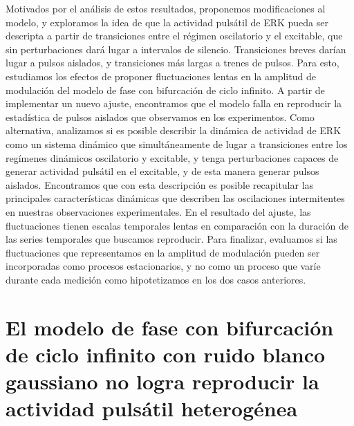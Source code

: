 \documentclass[./main.tex]{subfiles}
\begin{document}
Motivados por el análisis de estos resultados, proponemos modificaciones al modelo, y exploramos la idea de que la actividad pulsátil de ERK pueda ser descripta a partir de transiciones entre el régimen oscilatorio y el excitable, que sin perturbaciones dará lugar a intervalos de silencio. Transiciones breves darían lugar a pulsos aislados, y transiciones más largas a trenes de pulsos. Para esto, estudiamos los efectos de proponer fluctuaciones lentas en la amplitud de modulación del modelo de fase con bifurcación de ciclo infinito. A partir de implementar un nuevo ajuste, encontramos que el modelo falla en reproducir la estadística de pulsos aislados que observamos en los experimentos. Como alternativa, analizamos si es posible describir la dinámica de actividad de ERK como un sistema dinámico que simultáneamente de lugar a transiciones entre los regímenes dinámicos oscilatorio y excitable, y tenga perturbaciones capaces de generar actividad pulsátil en el excitable, y de esta manera generar pulsos aislados. Encontramos que con esta descripción es posible recapitular las principales características dinámicas que describen las oscilaciones intermitentes en nuestras observaciones experimentales. En el resultado del ajuste, las fluctuaciones tienen escalas temporales lentas en comparación con la duración de las series temporales que buscamos reproducir. Para finalizar, evaluamos si las fluctuaciones que representamos en la amplitud de modulación pueden ser incorporadas como procesos estacionarios, y no como un proceso que varíe durante cada medición como hipotetizamos en los dos casos anteriores. 

\section{El modelo de fase con bifurcación de ciclo infinito con ruido blanco gaussiano no logra reproducir la actividad pulsátil heterogénea}
\label{C6_sec:alder_ruido_fit}
\end{document}
